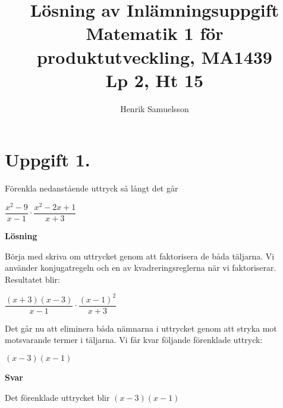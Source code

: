 \documentclass{article}
\begin{document}
\begin{titlepage}
\title{Lösning av Inlämningsuppgift \\ Matematik 1 för produktutveckling, MA1439 \\ Lp 2, Ht 15}
\author{Henrik Samuelsson}
\maketitle
\thispagestyle{empty}
\end{titlepage}

\section*{Uppgift 1.}
Förenkla nedanstående uttryck så långt det går

$\dfrac{x^2 - 9}{x - 1} \cdot \dfrac{x^2 - 2x + 1}{x + 3}$

\textbf{Lösning}

Börja med skriva om uttrycket genom att  faktorisera de båda täljarna. Vi använder konjugatregeln och en av kvadreringsreglerna när vi faktoriserar. Resultatet blir:

$\dfrac{(x + 3)(x-3)}{x - 1} \cdot \dfrac{(x-1)^2}{x + 3}$

Det går nu att eliminera båda nämnarna i uttrycket genom att stryka mot motsvarande termer i täljarna. Vi får kvar följande förenklade uttryck: 

$(x-3)(x-1)$

\textbf{Svar}

Det förenklade uttrycket blir $(x-3)(x-1)$
\end{document}

